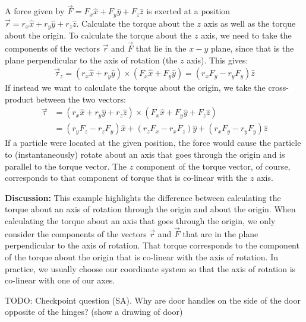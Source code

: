 \begin{example}{A force given by $\vec F=F_x\hat x + F_y \hat y + F_z \hat z$ is exerted at a position $\vec r=r_x \hat x + r_y \hat y + r_z\hat z$. Calculate the torque about the $z$ axis as well as the torque about the origin.}
To calculate the torque about the $z$ axis, we need to take the components of the vectors $\vec r$ and $\vec F$ that lie in the $x-y$ plane, since that is the plane perpendicular to the axis of rotation (the $z$ axis). This gives:
\begin{align*}
\vec\tau_z =(r_x \hat x + r_y \hat y) \times (F_x\hat x + F_y \hat y) =(r_xF_y-r_yF_y)\hat z
\end{align*}
If instead we want to calculate the torque about the origin, we take the cross-product between the two vectors:
\begin{align*}
\vec\tau &=(r_x \hat x + r_y \hat y+ r_z\hat z) \times (F_x\hat x + F_y \hat y+ F_z \hat z)\\
&=(r_yF_z-r_zF_y)\hat x+(r_zF_x-r_xF_z)\hat y+(r_xF_y-r_yF_y)\hat z
\end{align*}
If a particle were located at the given position, the force would cause the particle to (instantaneously) rotate about an axis that goes through the origin and is parallel to the torque vector. The $z$ component of the torque vector, of course, corresponds to that component of torque that is co-linear with the $z$ axis.

\textbf{Discussion: }This example highlights the difference between calculating the torque about an axis of rotation through the origin and about the origin. When calculating the torque about an axis that goes through the origin, we only consider the components of the vectors $\vec r$ and $\vec F$ that are in the plane perpendicular to the axis of rotation. That torque corresponds to the component of the torque about the origin that is co-linear with the axis of rotation. In practice, we usually choose our coordinate system so that the axis of rotation is co-linear with one of our axes. 
\end{example}

TODO: Checkpoint question (SA). Why are door handles on the side of the door opposite of the hinges? (show a drawing of door) 

